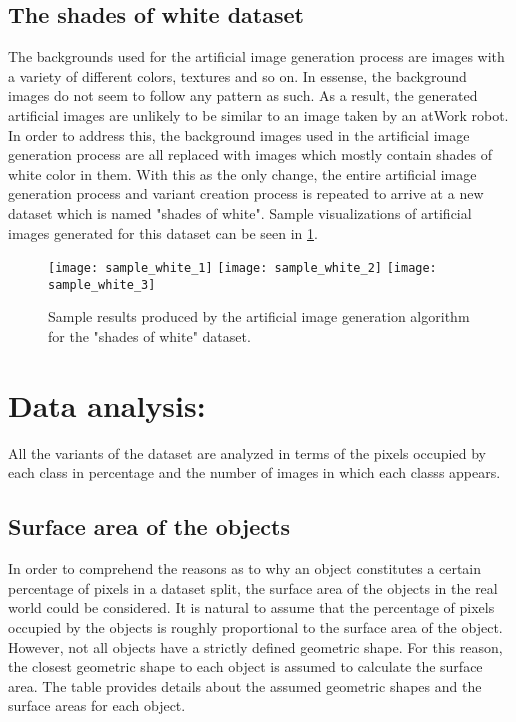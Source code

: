 \documentclass[paper=a4,11pt,parskip=half,toc=listof]{scrartcl}
\begin{document}
	\subsection{The shades of white dataset}
The backgrounds used for the artificial image generation process are images with a variety of different colors, textures and so on. In essense, the background images do not seem to follow any pattern as such. As a result, the generated artificial images are unlikely to be similar to an image taken by an atWork robot. In order to address this, the background images used in the artificial image generation process are all replaced with images which mostly contain shades of white color in them. With this as the only change, the entire artificial image generation process and variant creation process is repeated to arrive at a new dataset which is named "shades of white". Sample visualizations of artificial images generated for this dataset can be seen in \ref{Fig:samplewhite}.

	\begin{figure}[htb!]
		\centering
		\texttt{[image: sample\_white\_1]}
		\texttt{[image: sample\_white\_2]}
		\texttt{[image: sample\_white\_3]}
		\caption{Sample results produced by the artificial image generation algorithm for the "shades of white" dataset.}
		\label{Fig:samplewhite}
	\end{figure}
	
\section{Data analysis:}
	All the variants of the dataset are analyzed in terms of the pixels occupied by each class in percentage and the number of images in which each classs appears.
	
	\subsection{Surface area of the objects}
		
		In order to comprehend the reasons as to why an object constitutes a certain percentage of pixels in a dataset split, the surface area of the objects in the real world could be considered. It is natural to assume that the percentage of pixels occupied by the objects is roughly proportional to the surface area of the object. However, not all objects have a strictly defined geometric shape. For this reason, the closest geometric shape to each object is assumed to calculate the surface area. The table provides details about the assumed geometric shapes and the surface areas for each object.
		
\end{document}

